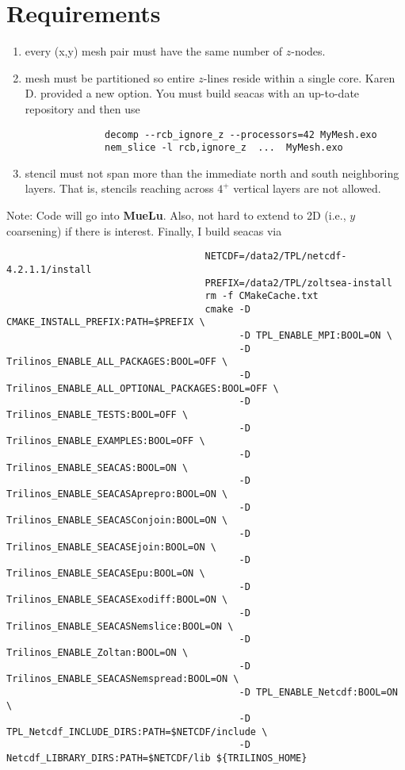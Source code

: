 \documentclass{article}[11pt]
\newcommand{\Mue}     {{\bf MueLu}}
\begin{document}
\section{Requirements}
%
\begin{enumerate}
\item every (x,y) mesh pair must have the same number of $z$-nodes. 
\item mesh must be partitioned so entire $z$-lines reside within a
   single core. Karen D. provided a new option. You must
   build seacas with an up-to-date repository and then use
\begin{verbatim}
              decomp --rcb_ignore_z --processors=42 MyMesh.exo
              nem_slice -l rcb,ignore_z  ...  MyMesh.exo
\end{verbatim}

\item stencil must not span more than the immediate north and south neighboring
   layers. That is, stencils reaching across $4^+$ vertical layers are not allowed.
\end{enumerate}
\noindent
Note: Code will go into \Mue. Also, not hard to extend to 2D
      (i.e., $y$ coarsening) if there is interest.
\newline
\noindent
\phantom{Note: }Finally, I build seacas via
{\tiny 
\begin{verbatim}
                                   NETCDF=/data2/TPL/netcdf-4.2.1.1/install
                                   PREFIX=/data2/TPL/zoltsea-install
                                   rm -f CMakeCache.txt
                                   cmake -D CMAKE_INSTALL_PREFIX:PATH=$PREFIX \
                                         -D TPL_ENABLE_MPI:BOOL=ON \
                                         -D Trilinos_ENABLE_ALL_PACKAGES:BOOL=OFF \
                                         -D Trilinos_ENABLE_ALL_OPTIONAL_PACKAGES:BOOL=OFF \
                                         -D Trilinos_ENABLE_TESTS:BOOL=OFF \
                                         -D Trilinos_ENABLE_EXAMPLES:BOOL=OFF \
                                         -D Trilinos_ENABLE_SEACAS:BOOL=ON \
                                         -D Trilinos_ENABLE_SEACASAprepro:BOOL=ON \
                                         -D Trilinos_ENABLE_SEACASConjoin:BOOL=ON \
                                         -D Trilinos_ENABLE_SEACASEjoin:BOOL=ON \
                                         -D Trilinos_ENABLE_SEACASEpu:BOOL=ON \
                                         -D Trilinos_ENABLE_SEACASExodiff:BOOL=ON \
                                         -D Trilinos_ENABLE_SEACASNemslice:BOOL=ON \
                                         -D Trilinos_ENABLE_Zoltan:BOOL=ON \
                                         -D Trilinos_ENABLE_SEACASNemspread:BOOL=ON \
                                         -D TPL_ENABLE_Netcdf:BOOL=ON \
                                         -D TPL_Netcdf_INCLUDE_DIRS:PATH=$NETCDF/include \
                                         -D Netcdf_LIBRARY_DIRS:PATH=$NETCDF/lib ${TRILINOS_HOME}
\end{verbatim}
}
\end{document}
